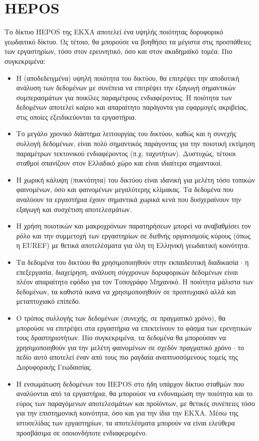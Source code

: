 \documentclass[11pt]{article}
\begin{document}
\section{HEPOS}
Το δίκτυο HEPOS της ΕΚΧΑ αποτελεί ένα υψηλής ποιότητας δορυφορικό γεωδαιτικό δίκτυο. Ως τέτοιο, θα μπορούσε να βοηθήσει τα μέγιστα στις προσπάθειες των εργαστηρίων, τόσο στον ερευνητικό, όσο και στον ακαδημαϊκό τομέα. Πιο συγκεκριμένα:
\begin{itemize}
\item Η (αποδεδειγμένα) υψηλή ποιότητα του δικτύου, θα επιτρέψει την αποδοτική ανάλυση των δεδομένων με συνέπεια να επιτρέψει την εξαγωγή σημαντικών συμπερασμάτων για ποικίλες παραμέτρους ενδιαφέροντος. Η ποιότητα των δεδομένων αποτελεί καίριο και απαραίτητο παράγοντα για εφαρμογές ακριβείας, στις οποίες εξειδικεύονται τα εργαστήρια.
\item Το μεγάλο χρονικό διάστημα λειτουργίας του δικτύου, καθώς και η συνεχής συλλογή δεδομένων, είναι πολύ σημαντικός παράγοντας για την ποιοτική εκτίμηση παραμέτρων τεκτονικού ενδιαφέροντος (π.χ. ταχυτήτων). Δυστυχώς, τέτοιοι σταθμοί σπανίζουν στον Ελλαδικό χώρο και είναι ιδιαίτερα σημαντικοί.
\item Η χωρική κάλυψη (πυκνότητα) του δικτύου είναι ιδανική για μελέτη τόσο τοπικών φαινομένων, όσο και φαινομένων μεγαλύτερης κλίμακας. Τα δεδομένα που αναλύουν τα εργαστήρια έχουν σημαντικά χωρικά κενά που δυσχεραίνουν την εξαγωγή και συσχέτιση αποτελεσμάτων.
\item Η χρήση ποιοτικών και μακροχρόνιων παρατηρήσεων μπορεί να αναβαθμίσει τον ρόλο και την συμμετοχή των εργαστηρίων σε διεθνής οργανισμούς κύρους (όπως η EUREF) με θετικά αποτελέσματα για όλη τη Ελληνική γεωδαιτική κοινότητα.
\item Τα δεδομένα του δικτύου θα χρησιμοποιηθούν στην εκπαιδευτική διαδικασία $\cdot$ η επεξεργασία, διαχείρηση, ανάλυση σύγχρονων δορυφορικών δεδομένων είναι πλέον απαραίτητο εφόδιο για τον Τοπογράφο Μηχανικό. Η ποιότητα μάλιστα των δεδομένων, τα καθιστά ικανα να χρησιμοποιηθούν σε προπτυχιακό αλλά και μεταπτυχιακό επίπεδο.
\item Ο τρόπος συλλογής των δεδομένων (συνεχής, σε πραγματικό χρόνο), θα μπορούσε να επιτρέψει στα εργαστήρια να επεκτείνουν το φάσμα των ερενητικών τους δραστηριοτήτων. Πίο συγκεκριμένα, τα δεδομένα θα μπορούσαν να χρησιμοποιηθούν για την μελέτη φαινομένων σε σχεδόν πραγματικό χρόνο $\cdot$ το πεδίο αυτό αποτελεί έναν από τους πιο ραγδαία αναπτυσσόμενους τομείς της Δορυφορικής Γεωδαισίας.
\item Η ενσωμάτωση δεδομένων του HEPOS στο ήδη υπάρχον δίκτυο σταθμών που αναλύονται από τα εργαστήρια, θα μπορούσε να ενδυναμώση την ποιότητα και το εύρος των παραγόμενων αποτελεσμάτων και προϊόντων, με θετικές συνέπειες τόσο για την επιστημονική κοινότητα, όσο και για την ίδια την ΕΚΧΑ. Μέσω της ιστοσελίδας των εργαστηρίων, τα αποτελέσματα μπορούν να είναι ελεύθερα προσβάσιμα σε οποιονδήποτε ενδιαφερομένο.
\end{itemize}
\end{document}
